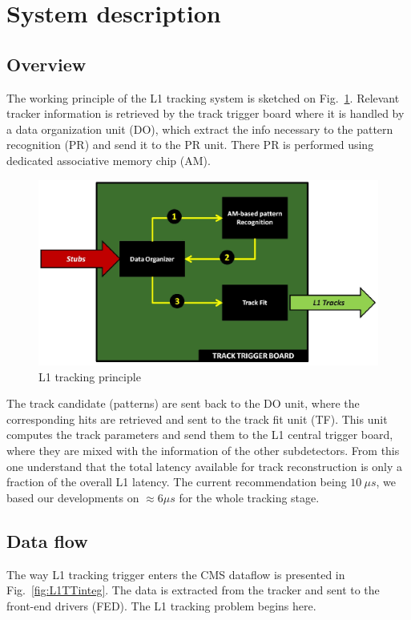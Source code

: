 \section{System description}
\label{sec:Description}

\subsection{Overview}

\noindent The working principle of the L1 tracking system is sketched on Fig.~\ref{fig:L1TT_principle}. Relevant tracker information is retrieved by the track trigger board where it is handled by a data organization unit (DO), which extract the info necessary to the pattern recognition (PR) and send it to the PR unit. There PR is performed using dedicated associative memory chip (AM). 

\begin{figure}[ht!]
\centering
\includegraphics[width=0.7\columnwidth]{Plots/L1TTprin.eps}
\caption{L1 tracking principle}
\label{fig:L1TT_principle}
\end{figure}

\noindent The track candidate (patterns) are sent back to the DO unit, where the corresponding hits are retrieved and sent to the track fit unit (TF). This unit computes the track parameters and send them to the L1 central trigger board, where they are mixed with the information of the other subdetectors. From this one understand that the total latency available for track reconstruction is only a fraction of the overall L1 latency. The current recommendation being $10~\mu s$, we based our developments on $\approx 6\mu s$ for the whole tracking stage.

\subsection{Data flow}

\noindent The way L1 tracking trigger enters the CMS dataflow is presented in Fig.~\ref{fig:L1TTinteg}. The data is extracted from the tracker and sent to the front-end drivers (FED). The L1 tracking problem begins here. 

